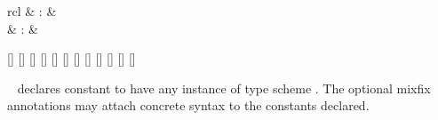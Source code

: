 \begin{isabellebody}
\begin{isamarkuptext}
  \begin{matharray}{rcl}
    \hypertarget{command.consts}{\hyperlink{command.consts}{\mbox{}}} & : &  \\
    \hypertarget{command.defs}{\hyperlink{command.defs}{\mbox{}}} & : &  \\
  \end{matharray}

  \begin{railoutput}
[]
\rail@plus
{}[]
[]
[]
\rail@bar
{}
[]
\rail@endbar
{}
\rail@endplus
\rail@end
{}
[]
\rail@bar
{}
[]
\rail@bar
{}
[]
\rail@endbar
\rail@bar
{}
[]
\rail@endbar
{}[]
\rail@endbar
{}
\rail@plus
{}[]
[]
\rail@endplus
\rail@end
\end{railoutput}


  \begin{description}

  \item \hyperlink{command.consts}{\mbox{}}~ declares constant  to have any instance of type scheme .  The optional
  mixfix annotations may attach concrete syntax to the constants
  declared.
  

\end{description}
\end{isamarkuptext}
\end{isabellebody}
